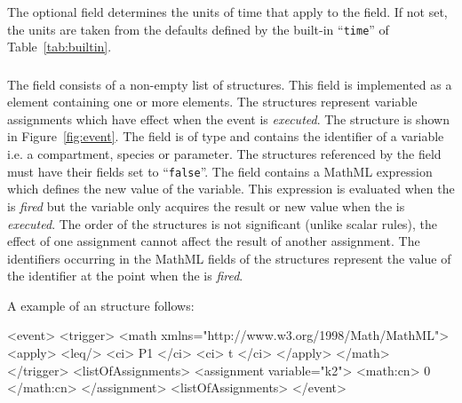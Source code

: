 \documentclass[10pt,twocolumntoc]{cekarticle}
\newcommand{\vref}[1]{\ref{#1}}
\begin{document}
\subsubsection{}
The optional field  determines the units of time
that apply to the  field. If not set, the units are
taken from the defaults defined by the built-in ``\texttt{time}''
of Table~\vref{tab:builtin}.

\subsubsection{}
The  field consists of a non-empty list of
 structures.  This field is implemented as a
 element containing one or more
 elements.  The 
structures represent variable assignments which have effect when
the event is \emph{executed}. The  structure is
shown in Figure~\ref{fig:event}. The  field is of
type  and contains the identifier of a variable i.e. a
compartment, species or parameter.  The structures referenced by
the  field must have their 
fields set to ``\texttt{false}''.  The  field
contains a MathML expression which defines the new value of the
variable.  This expression is evaluated when the  is
\emph{fired} but the variable only acquires the result or new
value when the  is \emph{executed}.  The order of the
 structures is not significant (unlike
scalar rules), the effect of one assignment cannot affect the
result of another assignment.  The identifiers occurring in the
MathML  fields of the 
structures represent the value of the identifier at the point when
the  is \emph{fired}.

A example of an  structure follows:

\begin{example}
<event>
    <trigger>
        <math xmlns="http://www.w3.org/1998/Math/MathML">
            <apply>
                <leq/>
                <ci> P1 </ci>
                <ci> t </ci>
            </apply>
        </math>
    </trigger>
    <listOfAssignments>
        <assignment variable="k2">
            <math:cn> 0 </math:cn>
        </assignment>
    <listOfAssignments>
</event>
\end{example}
\end{document}
